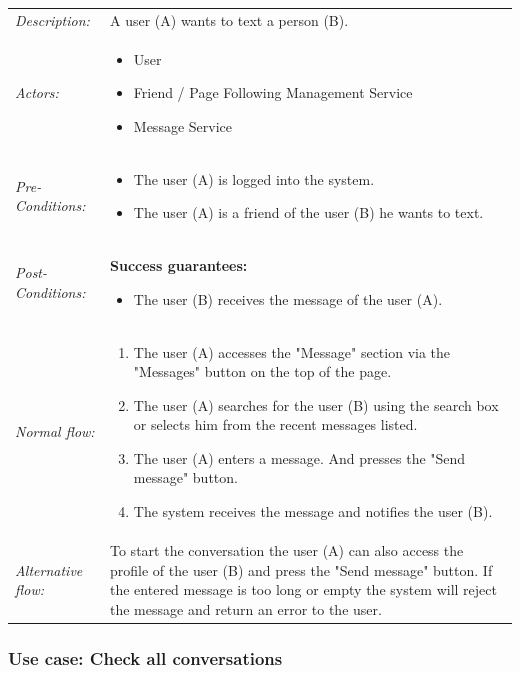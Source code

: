 \documentclass[11pt,a4paper]{report}
\begin{document}
\begin{longtable}{p{} | p{}}
        \hline
        \emph{Description:} & A user (A) wants to text a person (B).\\
        \emph{Actors:} & 
            \begin{itemize} 
                \item User
                \item Friend / Page Following Management Service
                \item Message Service
             \end{itemize} \\
        \emph{Pre-Conditions:} & 
            \begin{itemize} 
                \item The user (A) is logged into the system.
                \item The user (A) is a friend of the user (B) he wants to text.
             \end{itemize} \\
        \emph{Post-Conditions:} & \textbf{Success guarantees:} 
            \begin{itemize} 
                \item The user (B) receives the message of the user (A).
            \end{itemize} \\
        \emph{Normal flow:} & 
            \begin{enumerate} 
                \item The user (A) accesses the "Message" section via the "Messages" button on the top of the page.
                \item The user (A) searches for the user (B) using the search box or selects him from the recent messages listed.
                \item The user (A) enters a message. And presses the "Send message" button.
                \item The system receives the message and notifies the user (B).
             \end{enumerate} \\
        \emph{Alternative flow:} & To start the conversation the user (A) can also access the profile of the user (B) and press the "Send message" button. If the entered message is too long or empty the system will reject the message and return an error to the user.\\ 
             \hline
\end{longtable}

\subsubsection{Use case: Check all conversations}
\end{document}
